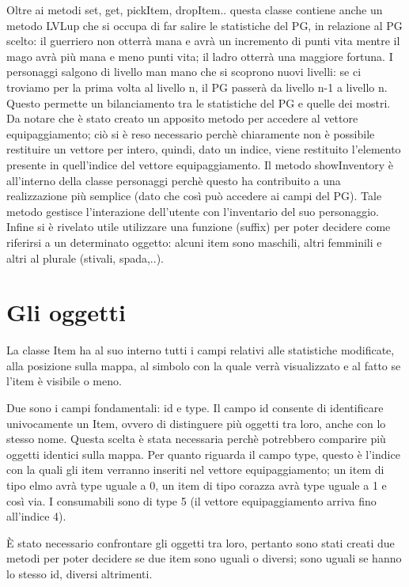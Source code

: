 \documentclass[10pt]{report}
\begin{document}
Oltre ai metodi set, get, pickItem, dropItem.. questa classe contiene anche un metodo LVLup che si occupa
di far salire le statistiche del PG, in relazione al PG scelto: il guerriero non otterrà mana e avrà un
incremento di punti vita mentre il mago avrà più mana e meno punti vita; il ladro otterrà una maggiore
fortuna. I personaggi salgono di livello man mano che si scoprono nuovi livelli: se ci troviamo per la prima volta al
livello n, il PG passerà da livello n-1 a livello n. Questo permette un bilanciamento tra
le statistiche del PG e quelle dei mostri.
Da notare che è stato creato un apposito metodo per accedere al vettore equipaggiamento; ciò si è reso
necessario perchè chiaramente non è possibile restituire un vettore per intero, quindi, dato un indice,
viene restituito l'elemento presente in quell'indice del vettore equipaggiamento.
Il metodo showInventory è all'interno della classe personaggi perchè questo ha contribuito a una 
realizzazione più semplice (dato che così può accedere ai campi del PG). Tale metodo gestisce
l'interazione dell'utente con l'inventario del suo personaggio.
Infine si è rivelato utile utilizzare una funzione (suffix) per poter decidere come riferirsi a un
determinato oggetto: alcuni item sono maschili, altri femminili e altri al plurale (stivali, spada,..).

\section{Gli oggetti}

La classe Item ha al suo interno tutti i campi relativi alle statistiche modificate, alla posizione sulla
mappa, al simbolo con la quale verrà visualizzato e al fatto se l'item è visibile o meno.

Due sono i campi fondamentali: id e type.
Il campo id consente di identificare univocamente un Item, ovvero di distinguere più oggetti tra loro,
anche con lo stesso nome. Questa scelta è stata necessaria perchè potrebbero comparire più 
oggetti identici sulla mappa. Per quanto riguarda il campo type, questo è l'indice con la quali gli item
verranno inseriti nel vettore equipaggiamento; un item di tipo elmo avrà type uguale a
0, un item di tipo corazza avrà type uguale a 1 e così via. I consumabili sono di type 5 (il vettore 
equipaggiamento arriva fino all'indice 4). 

È stato necessario confrontare gli oggetti tra loro, pertanto sono stati creati due metodi per poter
decidere se due item sono uguali o diversi; sono uguali se hanno lo stesso id, diversi altrimenti.
\end{document}
